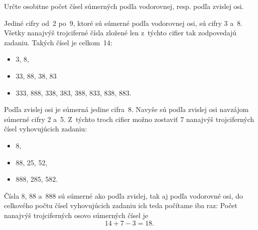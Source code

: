 {%
\napad
Určte osobitne počet čísel súmerných podľa vodorovnej, resp. podľa zvislej osi.

\riesenie
Jediné cifry od~2 po~9, ktoré sú súmerné podľa vodorovnej osi, sú
cifry 3 a~8.
Všetky nanajvýš trojciferné čísla zložené len z~týchto cifier tak
zodpovedajú zadaniu.
Takých čísel je celkom~14:
\begin{itemize}
\item 3, 8,
\item 33, 88, 38, 83
\item 333, 888, 338, 383, 388, 833, 838, 883.%
\end{itemize}


Podľa zvislej osi je súmerná jedine cifra~8.
Navyše sú podľa zvislej osi navzájom súmerné cifry 2 a~5.
Z~týchto troch cifier možno zostaviť 7 nanajvýš trojciferných čísel vyhovujúcich
zadaniu:
\begin{itemize}
\item 8,
\item 88, 25, 52,
\item 888, 285, 582.
\end{itemize}

Čísla 8, 88 a~888 sú súmerné ako podľa zvislej, tak aj podľa vodorovné osi,
do celkového počtu čísel vyhovujúcich zadaniu ich teda počítame iba raz:
Počet nanajvýš trojciferných osovo súmerných čísel je
$$
14+7-3=18.
$$
}

